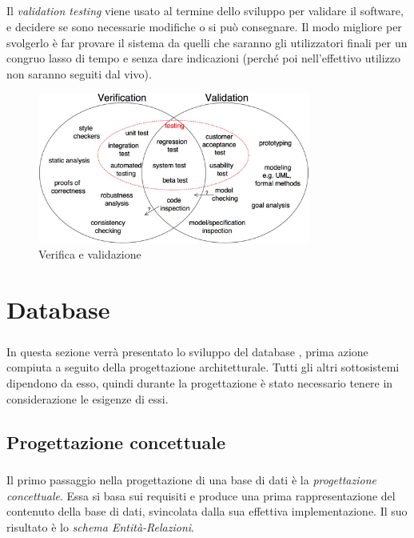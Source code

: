 \documentclass[12pt,a4paper,twoside,english,italian]{book}
\begin{document}
\newpage

\paragraph{} Il \emph{validation testing} viene usato al termine dello sviluppo per validare il software, e decidere se sono necessarie modifiche o si può consegnare. Il modo migliore per svolgerlo è far provare il sistema da quelli che saranno gli utilizzatori finali per un congruo lasso di tempo e senza dare indicazioni (perché poi nell'effettivo utilizzo non saranno seguiti dal vivo). 

\begin{figure}[H]
    \centering
    \includegraphics[width=0.8\textwidth]{img/verifica_validazione.jpg}
    \caption{Verifica e validazione}
\end{figure}



\chapter{Database}

\paragraph{} In questa sezione verrà presentato lo sviluppo del database \cite{db}, prima azione compiuta a seguito della progettazione architetturale. Tutti gli altri sottosistemi dipendono da esso, quindi durante la progettazione è stato necessario tenere in considerazione le esigenze di essi.

\section{Progettazione concettuale}

\paragraph{} Il primo passaggio nella progettazione di una base di dati è la \emph{progettazione concettuale}. Essa si basa sui requisiti e produce una prima rappresentazione del contenuto della base di dati, svincolata dalla sua effettiva implementazione. Il suo risultato è lo \emph{schema Entità-Relazioni}. 
\end{document}

